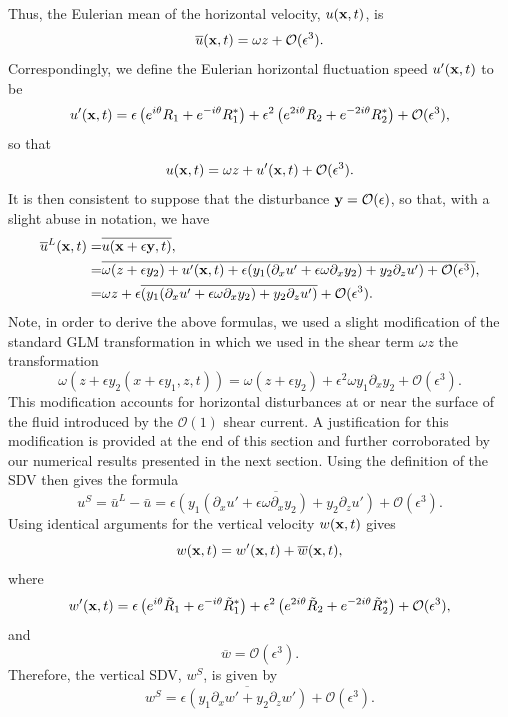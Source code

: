 \documentclass{JFM_Style/jfm}
\newcommand{\pd}{\partial}
\begin{document}
Thus, the Eulerian mean of the horizontal velocity, $u({\bf x},t)$, is  
\[
\overline{u}({\bf x},t) = \omega z + \mathcal{O}(\epsilon^{3}).
\]
Correspondingly, we define the Eulerian horizontal fluctuation speed $u'({\bf x},t)$ to be
\[
u'({\bf x},t) = \epsilon\left(e^{i\theta}R_{1} + e^{-i\theta}R_{1}^{\ast} \right)
+  \epsilon^{2}\left( e^{2i\theta}R_{2} + e^{-2i\theta}R_{2}^{\ast}\right)  + \mathcal{O}(\epsilon^{3}),
\]
so that  
\[
u({\bf x},t) = \omega z +  u'({\bf x},t) + \mathcal{O}(\epsilon^{3}).
\]
It is then consistent to suppose that the disturbance ${\bf y}=\mathcal{O}(\epsilon)$, so that, with a slight abuse in notation, we have 
\begin{align}
\overline{u}^{L}({\bf x},t) = & \overline{u({\bf x} + \epsilon {\bf y},t)}, \nonumber \\
= & \overline{\omega (z + \epsilon y_{2}) +  u'({\bf x},t) + \epsilon (y_{1}(\pd_{x}u'+\epsilon\omega\pd_{x}y_{2}) + y_{2} \pd_{z}u') + \mathcal{O}(\epsilon^{3})}, \nonumber \\
= & \omega z + \epsilon \overline{(y_{1}(\pd_{x}u'+\epsilon\omega\pd_{x}y_{2}) + y_{2}\pd_{z}u')} + \mathcal{O}(\epsilon^{3}). \label{lagrandrift}
\end{align}
Note, in order to derive the above formulas, we used a slight modification of the standard GLM transformation in which we used in the shear term $\omega z$ the transformation
\[
\omega(z+\epsilon y_{2}(x+\epsilon y_{1},z,t)) = \omega (z + \epsilon y_{2}) + \epsilon^{2}\omega y_{1}\pd_{x}y_{2} + \mathcal{O}(\epsilon^{3}).
\]
This modification accounts for horizontal disturbances at or near the surface of the fluid introduced by the $\mathcal{O}(1)$ shear current.  A justification for this modification is provided at the end of this section and further corroborated by our numerical results presented in the next section.  Using the definition of the SDV then gives the formula 
\[
u^{S} = \bar{u}^{L} - \bar{u} = \epsilon \overline{(y_{1}(\pd_{x}u'+\epsilon\omega\pd_{x}y_{2}) + y_{2}\pd_{z}u' )} + \mathcal{O}(\epsilon^{3}).
\]
Using identical arguments for the vertical velocity $w({\bf x},t)$ gives 
\[
w({\bf x},t) = w'({\bf x},t) + \overline{w}({\bf x},t),
\]
where 
\[
w'({\bf x},t)= \epsilon\left(e^{i\theta}\tilde{R}_{1} + e^{-i\theta}\tilde{R}_{1}^{\ast} \right)
+  \epsilon^{2}\left( e^{2i\theta}\tilde{R}_{2} + e^{-2i\theta}\tilde{R}_{2}^{\ast}\right)  + \mathcal{O}(\epsilon^{3}),
\]
and 
\[
\overline{w}= \mathcal{O}(\epsilon^{3}).  
\]
Therefore, the vertical SDV, $w^{S}$, is given by
\[
w^{S} = \epsilon \overline{(y_{1}\pd_{x}w'+ y_{2}\pd_{z}w')} + \mathcal{O}(\epsilon^{3}).
\]
\end{document}
